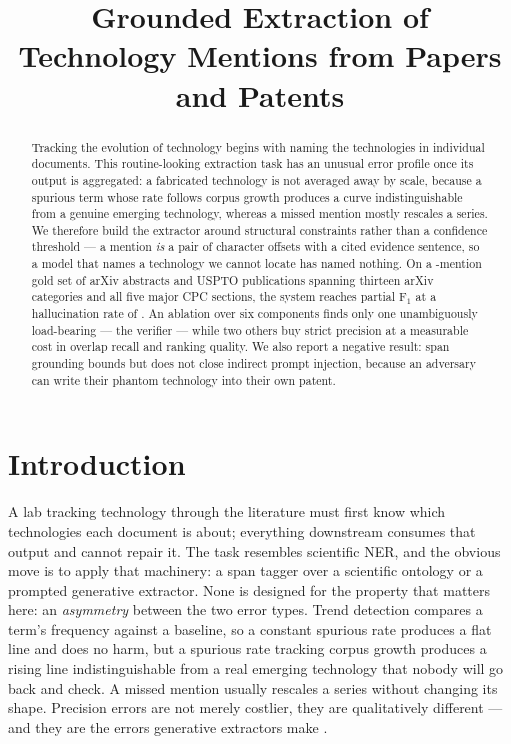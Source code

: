 \documentclass[11pt]{article}
\title{Grounded Extraction of Technology Mentions from Papers and Patents}
\author{}
\begin{document}
\maketitle

\begin{abstract}
Tracking the evolution of technology begins with naming the technologies in
individual documents. This routine-looking extraction task has an unusual error
profile once its output is aggregated: a fabricated technology is not averaged
away by scale, because a spurious term whose rate follows corpus growth produces
a curve indistinguishable from a genuine emerging technology, whereas a missed
mention mostly rescales a series. We therefore build the extractor around
structural constraints rather than a confidence threshold --- a mention
\emph{is} a pair of character offsets with a cited evidence sentence, so a model
that names a technology we cannot locate has named nothing. On a
\NumGold-mention gold set of \NumPapers{} arXiv abstracts and \NumPatents{}
USPTO publications spanning thirteen arXiv categories and all five major CPC
sections, the system reaches \RFullPF{} partial F$_1$ at a hallucination rate of
\RFullHalluc. An ablation over six components finds only one unambiguously
load-bearing --- the verifier --- while two others buy strict precision at a
measurable cost in overlap recall and ranking quality. We also report a negative
result: span grounding bounds but does not close indirect prompt injection,
because an adversary can write their phantom technology into their own patent.
\end{abstract}

\section{Introduction}

A lab tracking technology through the literature must first know which
technologies each document is about; everything downstream consumes that output
and cannot repair it. The task resembles scientific NER, and the obvious move is
to apply that machinery: a span tagger over a scientific ontology
\cite{luan2018scierc} or a prompted generative extractor.
None is designed for the property that matters here: an \emph{asymmetry} between
the two error types. Trend detection compares a term's frequency against a
baseline, so a constant spurious rate produces a flat line and does no harm, but
a spurious rate tracking corpus growth produces a rising line indistinguishable
from a real emerging technology that nobody will go back and check. A missed
mention usually rescales a series without changing its shape. Precision errors
are not merely costlier, they are qualitatively different --- and they are the
errors generative extractors make \cite{ji2023hallucination}.
\end{document}
